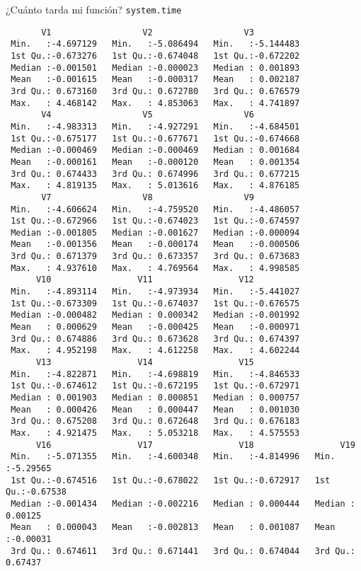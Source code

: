 \documentclass[xcolor={usenames,svgnames,dvipsnames}]{beamer}
\begin{document}
\begin{frame}[label={sec:org4ea8038},fragile]{¿Cuánto tarda mi función? \texttt{system.time}}
\begin{verbatim}
       V1                  V2                  V3           
 Min.   :-4.697129   Min.   :-5.086494   Min.   :-5.144483  
 1st Qu.:-0.673276   1st Qu.:-0.674048   1st Qu.:-0.672202  
 Median :-0.001501   Median :-0.000023   Median : 0.001893  
 Mean   :-0.001615   Mean   :-0.000317   Mean   : 0.002187  
 3rd Qu.: 0.673160   3rd Qu.: 0.672780   3rd Qu.: 0.676579  
 Max.   : 4.468142   Max.   : 4.853063   Max.   : 4.741897  
       V4                  V5                  V6           
 Min.   :-4.983313   Min.   :-4.927291   Min.   :-4.684501  
 1st Qu.:-0.675177   1st Qu.:-0.677671   1st Qu.:-0.674668  
 Median :-0.000469   Median :-0.000469   Median : 0.001684  
 Mean   :-0.000161   Mean   :-0.000120   Mean   : 0.001354  
 3rd Qu.: 0.674433   3rd Qu.: 0.674996   3rd Qu.: 0.677215  
 Max.   : 4.819135   Max.   : 5.013616   Max.   : 4.876185  
       V7                  V8                  V9           
 Min.   :-4.606624   Min.   :-4.759520   Min.   :-4.486057  
 1st Qu.:-0.672966   1st Qu.:-0.674023   1st Qu.:-0.674597  
 Median :-0.001805   Median :-0.001627   Median :-0.000094  
 Mean   :-0.001356   Mean   :-0.000174   Mean   :-0.000506  
 3rd Qu.: 0.671379   3rd Qu.: 0.673357   3rd Qu.: 0.673683  
 Max.   : 4.937610   Max.   : 4.769564   Max.   : 4.998585  
      V10                 V11                 V12           
 Min.   :-4.893114   Min.   :-4.973934   Min.   :-5.441027  
 1st Qu.:-0.673309   1st Qu.:-0.674037   1st Qu.:-0.676575  
 Median :-0.000482   Median : 0.000342   Median :-0.001992  
 Mean   : 0.000629   Mean   :-0.000425   Mean   :-0.000971  
 3rd Qu.: 0.674886   3rd Qu.: 0.673628   3rd Qu.: 0.674397  
 Max.   : 4.952198   Max.   : 4.612258   Max.   : 4.602244  
      V13                 V14                 V15           
 Min.   :-4.822871   Min.   :-4.698819   Min.   :-4.846533  
 1st Qu.:-0.674612   1st Qu.:-0.672195   1st Qu.:-0.672971  
 Median : 0.001903   Median : 0.000851   Median : 0.000757  
 Mean   : 0.000426   Mean   : 0.000447   Mean   : 0.001030  
 3rd Qu.: 0.675208   3rd Qu.: 0.672648   3rd Qu.: 0.676183  
 Max.   : 4.921475   Max.   : 5.053218   Max.   : 4.575553  
      V16                 V17                 V18                 V19          
 Min.   :-5.071355   Min.   :-4.600348   Min.   :-4.814996   Min.   :-5.29565  
 1st Qu.:-0.674516   1st Qu.:-0.678022   1st Qu.:-0.672917   1st Qu.:-0.67538  
 Median :-0.001434   Median :-0.002216   Median : 0.000444   Median : 0.00125  
 Mean   : 0.000043   Mean   :-0.002813   Mean   : 0.001087   Mean   :-0.00031  
 3rd Qu.: 0.674611   3rd Qu.: 0.671441   3rd Qu.: 0.674044   3rd Qu.: 0.67437  

\end{verbatim}
\end{frame}
\end{document}
